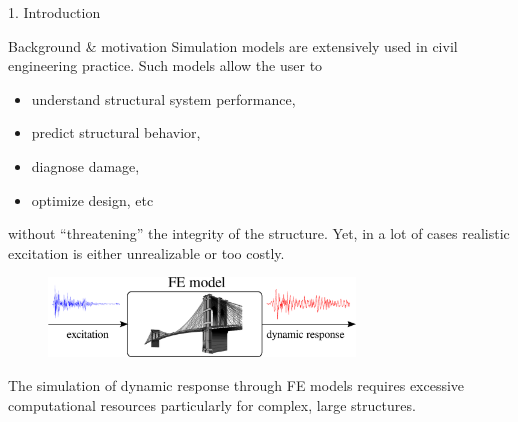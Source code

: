 \documentclass[10pt,xcolor = dvipsnames]{beamer}
\newcommand{\vc}[1]{\vspace*{#1cm}}
\newcommand{\Blue}{\color{blue}}
\newcommand{\Red}{\color{red}}
\begin{document}
\clearpage



\begin{frame}[t]{1. Introduction}

\vc{-0.3}\begin{block}{Background \& motivation}
\small Simulation models are extensively used in civil engineering practice. Such models allow the user to 
\begin{itemize}
\item{{\Red understand} structural system performance,}
\item{{\Blue predict} structural behavior,}
\item{{\Red diagnose} damage,}
\item{{\Blue optimize} design, etc}
\end{itemize} 
without ``threatening'' the integrity of the structure. Yet, in a lot of cases realistic excitation is either {\Red unrealizable} or too {\Red costly}. 
\end{block}



\vc{-0.1}\begin{block}{}

\begin{figure}[t!]
\centering
\includegraphics[height = 60pt]{dynamic.pdf}
\end{figure}

\vc{-0.2}\small The simulation of {\Blue dynamic response} through FE models requires {\Red excessive computational resources} particularly for complex, large structures.
 
\end{block}

\end{frame}
\end{document}
